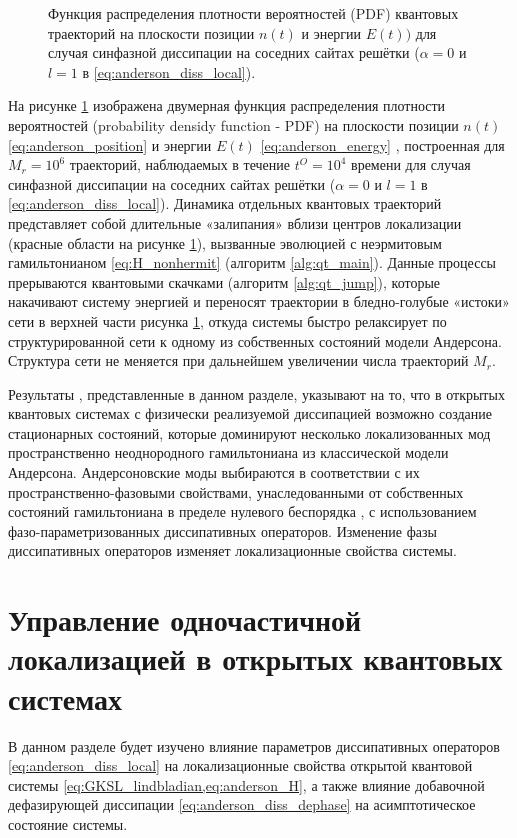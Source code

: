 \begin{figure}[ht]
	\caption[Плотность вероятностей квантовых траекторий на плоскости позиции и энергий в случае  локализации Андерсона]{
		Функция распределения плотности вероятностей (PDF) квантовых траекторий на плоскости позиции \(n(t)\) и энергии \(E(t))\) для случая синфазной диссипации на соседних сайтах решётки (\(\alpha=0\) и \(l=1\) в \cref{eq:anderson_diss_local}).
	}
	\label{fig:anderson_qj_1}
\end{figure}

На рисунке \cref{fig:anderson_qj_1} изображена двумерная функция распределения плотности вероятностей (probability densidy function - PDF) на плоскости позиции \(n(t)\) \cref{eq:anderson_position} и энергии \(E(t)\) \cref{eq:anderson_energy} , построенная для \(M_r=10^6\) траекторий, наблюдаемых в течение \(t^O=10^4\) времени для случая синфазной диссипации на соседних сайтах решётки (\(\alpha=0\) и \(l=1\) в \cref{eq:anderson_diss_local}). Динамика отдельных квантовых траекторий представляет собой длительные «залипания» вблизи центров локализации (красные области на рисунке \cref{fig:anderson_qj_1}), вызванные эволюцией с неэрмитовым гамильтонианом \cref{eq:H_nonhermit} (алгоритм \ref{alg:qt_main}). Данные процессы прерываются квантовыми скачками (алгоритм \ref{alg:qt_jump}), которые накачивают систему энергией и переносят траектории в бледно-голубые «истоки» сети в верхней части рисунка \cref{fig:anderson_qj_1}, откуда системы быстро релаксирует по структурированной сети к одному из собственных состояний модели Андерсона. Структура сети не меняется при дальнейшем увеличении числа траекторий \(M_r\).

Результаты \cite{Yusipov2017}, представленные в данном разделе, указывают на то, что в открытых квантовых системах с физически реализуемой диссипацией возможно создание стационарных состояний, которые доминируют несколько локализованных мод пространственно неоднородного гамильтониана из классической модели Андерсона. Андерсоновские моды выбираются в соответствии с их пространственно-фазовыми свойствами, унаследованными от собственных состояний гамильтониана в пределе нулевого беспорядка \cite{Ishii1973}, с использованием фазо-параметризованных диссипативных операторов. Изменение фазы диссипативных операторов изменяет локализационные свойства системы.
 
\section{Управление одночастичной локализацией в открытых квантовых системах}\label{sec:ch1/epjb}
В данном разделе будет изучено влияние параметров диссипативных операторов \cref{eq:anderson_diss_local} на локализационные свойства открытой квантовой системы \cref{eq:GKSL_lindbladian,eq:anderson_H}, а также влияние добавочной дефазирующей диссипации \cref{eq:anderson_diss_dephase} на асимптотическое состояние системы.


